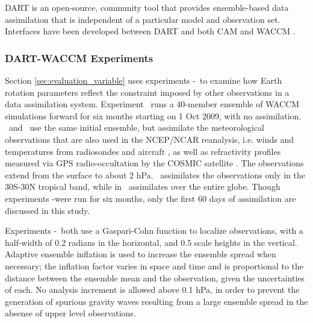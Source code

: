 DART \citep{Anderson2009} is an open-source, community tool that provides ensemble-based data assimilation that is independent of a particular model and observation set.
Interfaces have been developed between DART and both CAM \citep{Raeder2012} and WACCM \citep{Pedatella2013}.

\subsubsection{DART-WACCM Experiments}
Section \ref{sec:evaluation_variable} uses experiments \WACCMNODA-\WACCMGLOBAL~to examine how Earth rotation parameters reflect the constraint imposed by other observations in a data assimilation system.  
Experiment \WACCMNODA~runs a 40-member ensemble of WACCM simulations forward for six months starting on 1 Oct 2009, with no assimilation. 
\WACCMTROPICS~and \WACCMGLOBAL~use the same initial ensemble, but assimilate the meteorological observations that are also used in the NCEP/NCAR reanalysis, i.e. winds and temperatures from radiosondes and aircraft \citep{Saha2010}, as well as refractivity profiles measured via GPS radio-occultation by the COSMIC satellite \citep{Anthes2008}.
The observations extend from the surface to about 2 hPa. 
\WACCMTROPICS~assimilates the observations only in the 30S-30N tropical band, while in \WACCMGLOBAL~assimilates over the entire globe.
Though experiments \WACCMNODA-\WACCMGLOBAL were run for six months, only the first 60 days of assimilation are discussed in this study.  

Experiments \WACCMTROPICS-\WACCMGLOBAL~both use a Gaspari-Cohn function \citep{Gaspari1999} to localize observations, with a half-width of 0.2 radians in the horizontal, and 0.5 scale heights in the vertical.  
Adaptive ensemble inflation \citep{Anderson2009tellus} is used to increase the ensemble spread when necessary; the inflation factor varies in space and time and is proportional to the distance between the ensemble mean and the observation, given the uncertainties of each.  
No analysis increment is allowed above 0.1 hPa, in order to prevent the generation of spurious gravity waves resulting from a large ensemble spread in the absense of upper level observations. 


